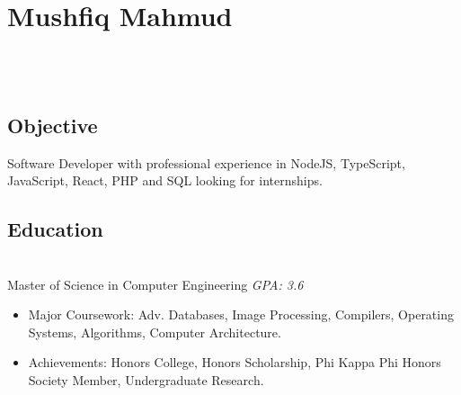 \documentclass[2pt]{resume}
\begin{document}
\sffamily

\section{Mushfiq Mahmud}

\begin{center}
\address{Tampa, FL}
 \\

 \\
\end{center}


\subsection{Objective}
\small Software Developer with professional experience in NodeJS, TypeScript, JavaScript, React, PHP and SQL looking for internships.


\subsection{Education}
 \\
Master of Science in Computer Engineering \hfill \emph{GPA: 3.6}

\begin{itemize}
\item \small Major Coursework: Adv. Databases, Image Processing, Compilers, Operating Systems, Algorithms, Computer Architecture.
\item \small Achievements: Honors College, Honors Scholarship, Phi Kappa Phi Honors Society Member, Undergraduate Research.
\end{itemize}

\end{document}
